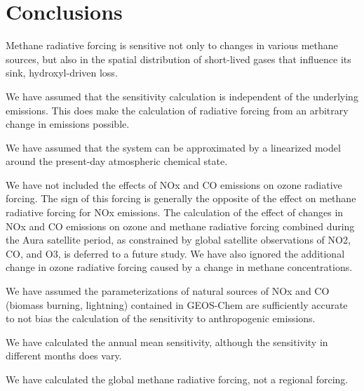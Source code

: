 \section{Conclusions}

Methane radiative forcing is sensitive not only to changes in various methane sources, but also in the spatial distribution of short-lived gases that influence its sink, hydroxyl-driven loss.

We have assumed that the sensitivity calculation is independent of the underlying emissions. This does make the calculation of radiative forcing from an arbitrary change in emissions possible.

We have assumed that the system can be approximated by a linearized model around the present-day atmospheric chemical state.

We have not included the effects of NOx and CO emissions on ozone radiative forcing. The sign of this forcing is generally the opposite of the effect on methane radiative forcing for NOx emissions. The calculation of the effect of changes in NOx and CO emissions on ozone and methane radiative forcing combined during the Aura satellite period, as constrained by global satellite observations of NO2, CO, and O3, is deferred to a future study. We have also ignored the additional change in ozone radiative forcing caused by a change in methane concentrations.

We have assumed the parameterizations of natural sources of NOx and CO (biomass burning, lightning) contained in GEOS-Chem are sufficiently accurate to not bias the calculation of the sensitivity to anthropogenic emissions.

We have calculated the annual mean sensitivity, although the sensitivity in different months does vary.

We have calculated the global methane radiative forcing, not a regional forcing.
